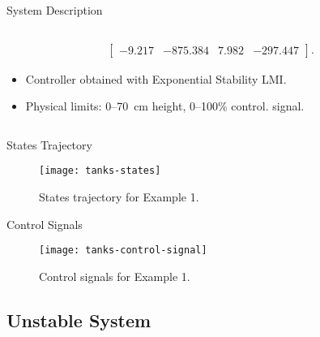 \begin{slide}{System Description}
\begin{columns}[c]
\begin{column}{0.58\textwidth}
\begin{equation}
\begin{aligned}
\begin{bmatrix}
            -9.217   & -875.384 & 7.982    & -297.447
          \end{bmatrix}.
        \end{aligned}
      \end{equation}
      \begin{itemize}
        \item Controller obtained with Exponential Stability LMI.
        \item Physical limits: 0--\SI{70}{\centi\metre} height, 0--100\% control.
              signal.
      \end{itemize}
    \end{column}%
  \end{columns}
\end{slide}

\begin{slide}{States Trajectory}
  \begin{figure}[ht!]
    \centering
    \captionsetup{justification=centering}
    \texttt{[image: tanks-states]}
    \caption{States trajectory for Example 1.}%
    \label{fig:level-system-control-states}
  \end{figure}
  \vspace*{\fill}
\end{slide}

\begin{slide}{Control Signals}
  \vspace*{\fill}
  \begin{figure}[ht!]
    \centering
    \captionsetup{justification=centering}
    \texttt{[image: tanks-control-signal]}
    \caption{Control signals for Example 1.}%
    \label{fig:level-system-control-signals}
  \end{figure}
\end{slide}

\subsection{Unstable System}%
\label{subsec:unstable-system}

